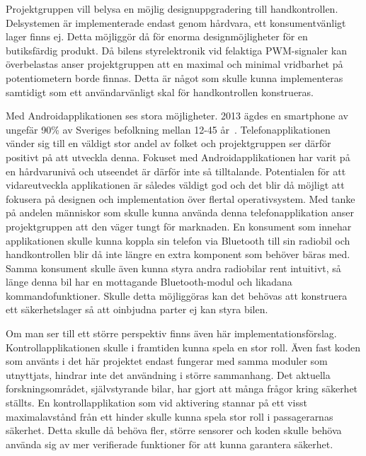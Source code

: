 \documentclass[a4paper]{article}
\begin{document}

\vspace{5mm} \noindent
Projektgruppen vill belysa en möjlig designuppgradering till handkontrollen. Delsystemen är implementerade endast genom hårdvara, ett konsumentvänligt lager finns ej. Detta möjliggör då för enorma designmöjligheter för en butiksfärdig produkt. Då bilens styrelektronik vid felaktiga PWM-signaler kan överbelastas anser projektgruppen att en maximal och minimal vridbarhet på potentiometern borde finnas. Detta är något som skulle kunna implementeras samtidigt som ett användarvänligt skal för handkontrollen konstrueras.


\vspace{5mm} \noindent
Med Androidapplikationen ses stora möjligheter. 2013 ägdes en smartphone av ungefär 90\% av Sveriges befolkning mellan 12-45 år~\cite{smartphoneStat}. Telefonapplikationen vänder sig till en väldigt stor andel av folket och projektgruppen ser därför positivt på att utveckla denna. Fokuset med Androidapplikationen har varit på en hårdvarunivå och utseendet är därför inte så tilltalande. Potentialen för att vidareutveckla applikationen är således väldigt god och det blir då möjligt att fokusera på designen och implementation över flertal operativsystem. Med tanke på andelen människor som skulle kunna använda denna telefonapplikation anser projektgruppen att den väger tungt för marknaden. En konsument som innehar applikationen skulle kunna koppla sin telefon via Bluetooth till sin radiobil och handkontrollen blir då inte längre en extra komponent som behöver bäras med. Samma konsument skulle även kunna styra andra radiobilar rent intuitivt, så länge denna bil har en mottagande Bluetooth-modul och likadana kommandofunktioner. Skulle detta möjliggöras kan det behövas att konstruera ett säkerhetslager så att oinbjudna parter ej kan styra bilen.

\vspace{5mm} \noindent
Om man ser till ett större perspektiv finns även här implementationsförslag. Kontrollapplikationen skulle i framtiden kunna spela en stor roll. Även fast koden som använts i det här projektet endast fungerar med samma moduler som utnyttjats, hindrar inte det användning i större sammanhang. Det aktuella forskningsområdet, självstyrande bilar, har gjort att många frågor kring säkerhet ställts. En kontrollapplikation som vid aktivering stannar på ett visst maximalavstånd från ett hinder skulle kunna spela stor roll i passagerarnas säkerhet. Detta skulle då behöva fler, större sensorer och koden skulle behöva använda sig av mer verifierade funktioner för att kunna garantera säkerhet.  
\end{document}
